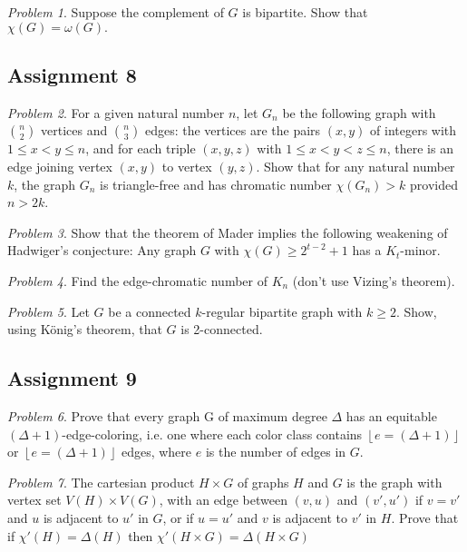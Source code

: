 \documentclass[11pt, fleqn, a4paper, landscape]{article}
\theoremstyle{plain} %
\theoremstyle{remark} %
\newtheorem{problem}{Problem}
\theoremstyle{definition} %
\begin{document}
\begin{multicols}{3}
\begin{problem}
Suppose the complement of $G$ is bipartite. Show that $\chi(G) = \omega(G).$
\end{problem}

\subsection{Assignment 8}

\begin{problem}
For a given natural number $n$, let $G_n$ be the following graph with $\binom{n}{2}$ vertices and $\binom{n}{3}$ edges: the vertices are the pairs $(x, y)$ of integers with $1\le x < y \le n$, and for each triple $(x, y, z)$ with $1\le x < y < z\le n$, there is an edge joining vertex $(x, y)$ to vertex $(y, z)$. Show that for any natural number $k$, the graph $G_n$ is triangle-free and has chromatic number $\chi(G_n) > k$ provided $n > 2k$.
\end{problem}

\begin{problem}
Show that the theorem of Mader implies the following weakening of Hadwiger's
conjecture: Any graph $G$ with $\chi(G) \ge 2^{t-2} + 1$ has a $K_t$-minor.
\end{problem}

\begin{problem}
Find the edge-chromatic number of $K_n$ (don't use Vizing's theorem).
\end{problem}

\begin{problem}
Let $G$ be a connected $k$-regular bipartite graph with $k\ge 2$. Show, using König's theorem, that $G$ is 2-connected.
\end{problem}

\subsection{Assignment 9}

\begin{problem}
Prove that every graph G of maximum degree $\Delta$ has an equitable $(\Delta + 1)$-edge-coloring, i.e. one where each color class contains $\left\lfloor e=(\Delta + 1)\right\rfloor$ or $\left\lfloor e=(\Delta + 1)\right\rfloor$ edges, where $e$ is the number of edges in $G$.
\end{problem}

\begin{problem}
The cartesian product $H \times G $ of graphs $H$ and $G$ is the graph with vertex set $V (H)\times V (G)$, with an edge between $(v, u)$ and $(v', u')$ if $v = v'$ and $u$ is adjacent to $u'$ in $G$, or
if $u = u'$ and $v$ is adjacent to $v'$ in $H$. Prove that if $\chi'(H) = \Delta(H)$ then $\chi'(H\times G) = \Delta(H\times G)$
\end{problem}


\end{multicols}
\end{document}
